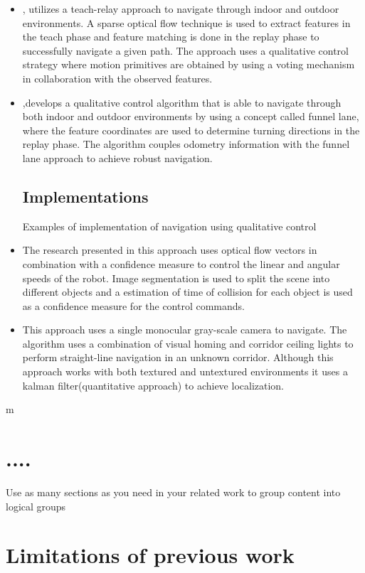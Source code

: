 	\begin{itemize}
	\item \cite{chen2006qualitative}, utilizes a teach-relay approach to navigate through indoor and outdoor environments. A sparse optical flow technique is used to extract features in the teach phase and feature matching is done in the replay phase to successfully navigate a given path. The approach uses a qualitative control strategy where motion primitives are obtained by using a voting mechanism in collaboration with the observed features.
	\item \cite{chen2009qualitative},develops a qualitative control algorithm that is able to navigate through both indoor and outdoor environments by using a concept called funnel lane, where the feature coordinates are used to determine turning directions in the replay phase. The algorithm couples odometry information with the funnel lane approach to achieve robust navigation.
	
	\subsection{Implementations}{Examples of implementation of navigation using qualitative control}
	\item \cite{sarcinelli2002using} The research presented in this approach uses optical flow vectors in combination with a confidence measure to control the linear and angular speeds of the robot. Image segmentation is used to split the scene into different objects and a estimation of time of collision for each object is used as a confidence measure for the control commands.
	\item \cite{murali2008autonomous} This approach uses a single monocular gray-scale camera to navigate. The algorithm uses a combination of visual homing and corridor ceiling lights to perform straight-line navigation in an unknown corridor. Although this approach works with both textured and untextured environments it uses a kalman filter(quantitative approach) to achieve localization.

\end{itemize}m

\section{....}
Use as many sections as you need in your related work to group content into logical groups

\section{Limitations of previous work}

